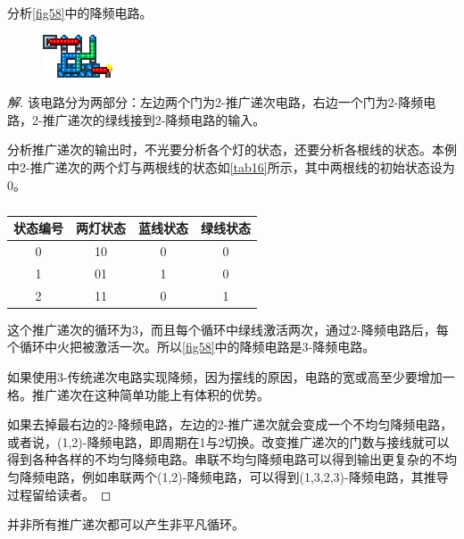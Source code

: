 \begin{example}{}{}
分析\autoref{fig58}中的降频电路。
\begin{figure}[H]
\centering
\includegraphics{images/332.png}
\caption{}\label{fig58}
\end{figure}
\end{example}
\begin{proof}[解]
该电路分为两部分：左边两个门为2-推广递次电路，右边一个门为2-降频电路，2-推广递次的绿线接到2-降频电路的输入。

分析推广递次的输出时，不光要分析各个灯的状态，还要分析各根线的状态。本例中2-推广递次的两个灯与两根线的状态如\autoref{tab16}所示，其中两根线的初始状态设为0。

\begin{table}
\centering
\begin{tabular}{|c|c|c|c|}
\hline
状态编号&两灯状态&蓝线状态&绿线状态\\\hline
0&10&0&0\\\hline
1&01&1&0\\\hline
2&11&0&1\\\hline
\end{tabular}
\caption{}\label{tab16}
\end{table}

这个推广递次的循环为3，而且每个循环中绿线激活两次，通过2-降频电路后，每个循环中火把被激活一次。所以\autoref{fig58}中的降频电路是3-降频电路。

如果使用3-传统递次电路实现降频，因为摆线的原因，电路的宽或高至少要增加一格。推广递次在这种简单功能上有体积的优势。

如果去掉最右边的2-降频电路，左边的2-推广递次就会变成一个不均匀降频电路，或者说，(1,2)-降频电路，即周期在1与2切换。改变推广递次的门数与接线就可以得到各种各样的不均匀降频电路。串联不均匀降频电路可以得到输出更复杂的不均匀降频电路，例如串联两个(1,2)-降频电路，可以得到(1,3,2,3)-降频电路，其推导过程留给读者。

\end{proof}

并非所有推广递次都可以产生非平凡循环。

